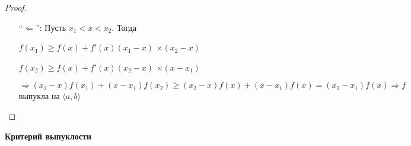 \begin{theorem-non}
\begin{proof}
\begin{itemize}
            $\Longrightarrow (x - x_0)f'(x_0) \leqslant f(x) - f(x_0)$

            Для доказательства со строгим знаком и строгой монотоннсотью тут нужно плясать с 
            \href{https://youtu.be/CAxh8kYEOlQ?t=6638}{бубном}. Пихнуть между $u$ и $x$ еще одну точку. Например $v$.
            И тогда уже получить неравенство со строгими знаками: $\frac{f(u) - f(x_0)}{u - x_0} < \frac{f(v) - f(x_0)}{v - x_0}< \frac{f(x) - f(x_0)}{x - x_0}$
            \item[``$\Longleftarrow$'':] Пусть $x_1 < x < x_2$. Тогда 
            
            $f(x_1) \geqslant f(x) + f'(x)(x_1 - x)$ \quad $\times (x_2 - x)$
             
            $f(x_2) \geqslant f(x) + f'(x)(x_2 - x)$ \quad $\times (x - x_1)$

            $\Longrightarrow (x_2 - x)f(x_1) + (x - x_1)f(x_2) \geqslant
            (x_2 - x)f(x) + (x - x_1)f(x) = (x_2 - x_1)f(x) \Longrightarrow f$ выпукла на $\langle a, b \rangle$
        \end{itemize}
    \end{proof}
\end{theorem-non}
\textbf{Критерий выпуклости} 

